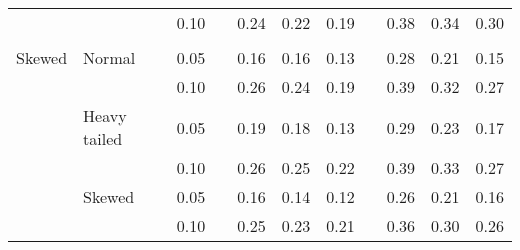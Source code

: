 \begin{table}[ht]
\begin{scriptsize}
\begin{center}
\begin{tabular}{ll p{.1cm} c p{.1cm} rrr p{.1cm} rrr}
             &              && 0.10 &&  0.24 & 0.22 & 0.19 && 0.38 & 0.34 & 0.30 \\ 
             &&&&&&&&&&&\\
Skewed       & Normal       && 0.05 &&  0.16 & 0.16 & 0.13 && 0.28 & 0.21 & 0.15 \\ 
             &              && 0.10 &&  0.26 & 0.24 & 0.19 && 0.39 & 0.32 & 0.27 \\ 
             & Heavy tailed && 0.05 &&  0.19 & 0.18 & 0.13 && 0.29 & 0.23 & 0.17 \\ 
             &              && 0.10 &&  0.26 & 0.25 & 0.22 && 0.39 & 0.33 & 0.27 \\ 
             & Skewed       && 0.05 &&  0.16 & 0.14 & 0.12 && 0.26 & 0.21 & 0.16 \\ 
             &              && 0.10 &&  0.25 & 0.23 & 0.21 && 0.36 & 0.30 & 0.26 \\ 

\hline
\end{tabular}
\end{center}
\end{scriptsize}
\end{table}

